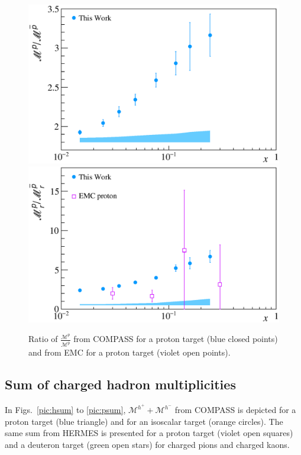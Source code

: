 \begin{figure}[!h]
  \centering
	\includegraphics[scale=0.48]{./gfx/Mult_p_ratio.eps}
	\includegraphics[scale=0.48]{./gfx/Mult_p_ratio_EMC.eps}
	\caption{Ratio of $\frac{\mathscr{M}^{p}}{\mathscr{M}^{\overline{p}}}$ from COMPASS for a proton target (blue closed points) and from EMC for a proton target (violet open points).}
	\label{pic:pratio}
\end{figure}

\subsection{Sum of charged hadron multiplicities}

In Figs.~\ref{pic:hsum} to \ref{pic:psum}, $\mathscr{M}^{h^+}+\mathscr{M}^{h^-}$ from COMPASS is depicted for a proton target (blue triangle) and for an isoscalar target (orange circles). The same sum from HERMES is presented for a proton target (violet open squares) and a deuteron target (green open stars) for charged pions and charged kaons.

